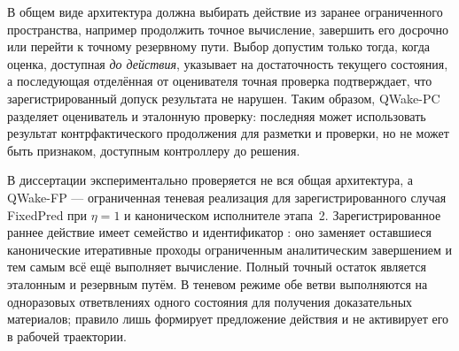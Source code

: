 В общем виде архитектура должна выбирать действие из заранее ограниченного
пространства, например продолжить точное вычисление, завершить его досрочно или
перейти к точному резервному пути. Выбор допустим только тогда,
когда оценка, доступная \emph{до действия}, указывает на достаточность текущего
состояния, а последующая отделённая от оценивателя точная проверка подтверждает, что
зарегистрированный допуск результата не нарушен. Таким образом, QWake-PC
разделяет оцениватель и эталонную проверку: последняя может использовать результат
контрфактического продолжения для разметки и проверки, но не может быть
признаком, доступным контроллеру до решения.

В диссертации экспериментально проверяется не вся общая архитектура, а
QWake-FP --- ограниченная теневая реализация для зарегистрированного случая
FixedPred при $\eta=1$ и каноническом исполнителе этапа~2. Зарегистрированное
раннее действие имеет семейство  и идентификатор
: оно заменяет оставшиеся
канонические итеративные проходы ограниченным аналитическим завершением и тем
самым всё ещё выполняет вычисление. Полный точный остаток
 является эталонным и резервным
путём. В теневом режиме обе ветви выполняются на одноразовых ответвлениях одного
состояния для получения доказательных материалов; правило лишь формирует
предложение действия и не активирует его в рабочей траектории.


